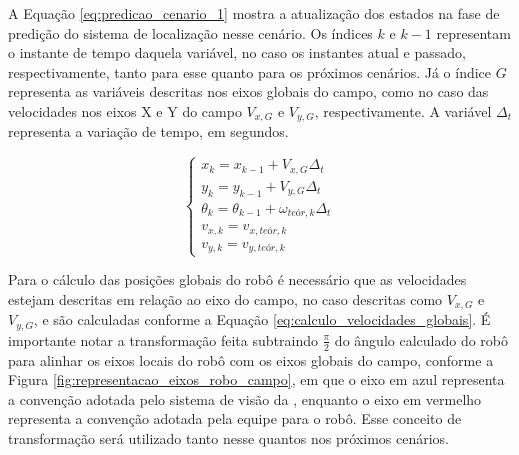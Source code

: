 \documentclass[acronym, symbols, table, deposito]{fei}
\begin{document}
				A Equação \eqref{eq:predicao_cenario_1} mostra a atualização dos estados na fase de predição do sistema de localização nesse cenário. Os índices $k$ e $k-1$ representam o instante de tempo daquela variável, no caso os instantes atual e passado, respectivamente, tanto para esse quanto para os próximos cenários. Já o índice $G$ representa as variáveis descritas nos eixos globais do campo, como no caso das velocidades nos eixos X e Y do campo $V_{x,G}$ e $V_{y,G}$, respectivamente. A variável $\Delta_t$ representa a variação de tempo, em segundos.
				
				\begin{equation}\label{eq:predicao_cenario_1}
					\begin{cases}
						x_{k} = x_{k-1} + V_{x,G} \Delta_t \\
						y_{k} = y_{k-1} + V_{y,G} \Delta_t  \\
						\theta_{k} = \theta_{k-1} + \omega_{teór,k} \Delta_t \\
						v_{x,k} = v_{x,teór,k}\\
						v_{y,k} = v_{y,teór,k}
					\end{cases}
				\end{equation}
			
			Para o cálculo das posições globais do robô é necessário que as velocidades estejam descritas em relação ao eixo do campo, no caso descritas como $V_{x,G}$ e $V_{y,G}$, e são calculadas conforme a Equação \eqref{eq:calculo_velocidades_globais}. É importante notar a transformação feita subtraindo $\frac{\pi}{2}$ do ângulo calculado do robô para alinhar os eixos locais do robô com os eixos globais do campo, conforme a Figura \ref{fig:representacao_eixos_robo_campo}, em que o eixo em azul representa a convenção adotada pelo sistema de visão da , enquanto o eixo em vermelho representa a convenção adotada pela equipe para o robô. Esse conceito de transformação será utilizado tanto nesse quantos nos próximos cenários.
			
			
\end{document}
